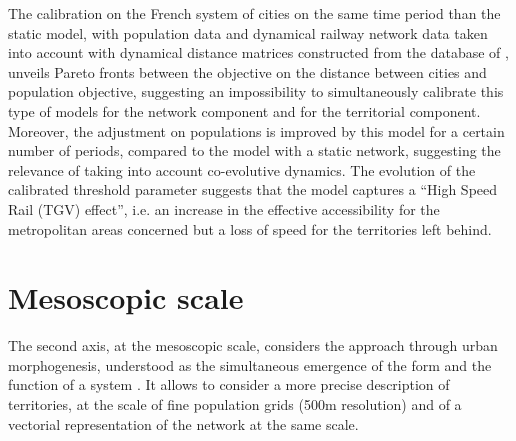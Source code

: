 \documentclass[11pt]{article}
\begin{document}
The calibration on the French system of cities on the same time period than the static model, with population data and dynamical railway network data taken into account with dynamical distance matrices constructed from the database of \cite{thevenin2013mapping}, unveils Pareto fronts between the objective on the distance between cities and population objective, suggesting an impossibility to simultaneously calibrate this type of models for the network component and for the territorial component. Moreover, the adjustment on populations is improved by this model for a certain number of periods, compared to the model with a static network, suggesting the relevance of taking into account co-evolutive dynamics. The evolution of the calibrated threshold parameter suggests that the model captures a ``High Speed Rail (TGV) effect'', i.e. an increase in the effective accessibility for the metropolitan areas concerned but a loss of speed for the territories left behind.


\section{Mesoscopic scale}


The second axis, at the mesoscopic scale, considers the approach through urban morphogenesis, understood as the simultaneous emergence of the form and the function of a system \citep{doursat2012morphogenetic}. It allows to consider a more precise description of territories, at the scale of fine population grids (500m resolution) and of a vectorial representation of the network at the same scale.
\end{document}
